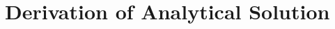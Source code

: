 \documentclass{article}
\begin{document}
	\appendix
	\section{Derivation of Analytical Solution}
	
	
\end{document}

